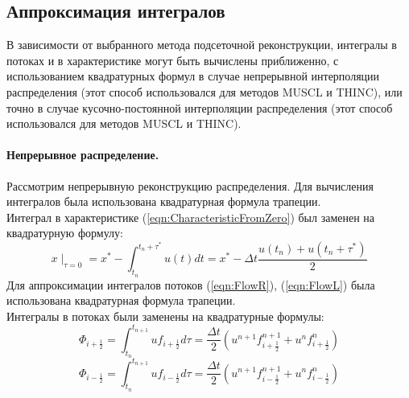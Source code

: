 \documentclass[10pt,a4paper]{article}
\begin{document}
\subsection{Аппроксимация интегралов}
В зависимости от выбранного метода подсеточной реконструкции, интегралы в потоках и в характеристике могут быть вычислены приближенно, с использованием квадратурных формул в случае непрерывной интерполяции распределения (этот способ использовался для методов MUSCL и THINC), или точно в случае кусочно-постоянной интерполяции распределения (этот способ использовался для методов MUSCL и THINC).
\paragraph{Непрерывное распределение.}
Рассмотрим непрерывную реконструкцию распределения. Для вычисления интегралов была использована квадратурная формула трапеции.\\
Интеграл в характеристике (\ref{eqn:CharacteristicFromZero}) был заменен на квадратурную формулу:
\begin{equation}
\label{eqn:CharacteristicQuadr}
x\mid_{\tau=0}=x^*-\int_{t_n}^{t_n+\tau^*}u(t)dt=x^*-\Delta t \frac{u(t_n)+u(t_n+\tau^*)}{2}
\end{equation}
Для аппроксимации интегралов потоков (\ref{eqn:FlowR}), (\ref{eqn:FlowL}) была использована квадратурная формула трапеции.\\
Интегралы в потоках были заменены на квадратурные формулы:
\begin{equation}
\label{eqn:flowRQuadr}
\Phi_{i+\frac{1}{2}}=\int_{t_n}^{t_{n+1}}
{u}f_{i+\frac{1}{2}}d\tau= \frac{\Delta t}{2}(
u^{n+1}f_{i+\frac{1}{2}}^{n+1} +
u^{n}f_{i+\frac{1}{2}}^{n}
)
\end{equation}
\begin{equation}
\label{eqn:flowLQuadr}
\Phi_{i-\frac{1}{2}}=\int_{t_n}^{t_{n+1}}
{u}f_{i-\frac{1}{2}}d\tau= \frac{\Delta t}{2}(
u^{n+1}f_{i-\frac{1}{2}}^{n+1} +
u^{n}f_{i-\frac{1}{2}}^{n}
)
\end{equation}
\end{document}
